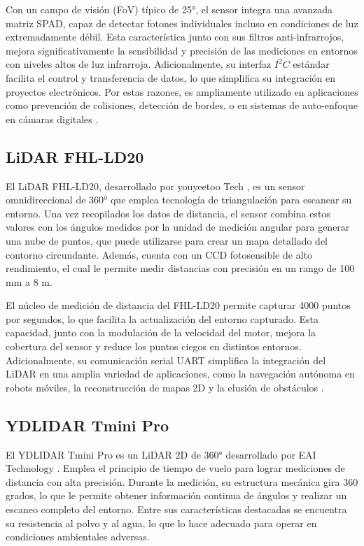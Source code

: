 Con un campo de visión (FoV) típico de 25°, el sensor integra una avanzada matriz SPAD, capaz de detectar fotones individuales incluso en condiciones de luz extremadamente débil. Esta característica junto con sus filtros anti-infrarrojos, mejora significativamente la sensibilidad y precisión de las mediciones en entornos con niveles altos de luz infrarroja. Adicionalmente, su interfaz $I^2C$ estándar facilita el control y transferencia de datos, lo que simplifica su integración en proyectos electrónicos. Por estas razones, es ampliamente utilizado en aplicaciones como prevención de colisiones, detección de bordes, o en sistemas de auto-enfoque en cámaras digitales \cite{stmicroelectronics_vl53l0x_2016}.

\subsection{LiDAR FHL-LD20}

El LiDAR FHL-LD20, desarrollado por youyeetoo Tech \cite{youyeetoo_tech_ld20_nodate}, es un sensor omnidireccional de 360° que emplea tecnología de triangulación para escanear su entorno. Una vez recopilados los datos de distancia, el sensor combina estos valores con los ángulos medidos por la unidad de medición angular para generar una nube de puntos, que puede utilizarse para crear un mapa detallado del contorno circundante. Además, cuenta con un CCD fotosensible de alto rendimiento, el cual le permite medir distancias con precisión en un rango de 100 mm a 8 m. 

El núcleo de medición de distancia del FHL-LD20 permite capturar 4000 puntos por segundos, lo que facilita la actualización del entorno capturado. Esta capacidad, junto con la modulación de la velocidad del motor, mejora la cobertura del sensor y reduce los puntos ciegos en distintos entornos. Adicionalmente, su comunicación serial UART simplifica la integración del LiDAR en una amplia variedad de aplicaciones, como la navegación autónoma en robots móviles, la reconstrucción de mapas 2D y la elusión de obstáculos \cite{youyeetoo_tech_ld20_nodate}.

\subsection{YDLIDAR Tmini Pro}

El YDLIDAR Tmini Pro es un LiDAR 2D de 360° desarrollado por EAI Technology \cite{eai_technology_ydlidar_2022}. Emplea el principio de tiempo de vuelo para lograr mediciones de distancia con alta precisión. Durante la medición, su estructura mecánica gira 360 grados, lo que le permite obtener información continua de ángulos y realizar un escaneo completo del entorno. Entre sus características destacadas se encuentra su resistencia al polvo y al agua, lo que lo hace adecuado para operar en condiciones ambientales adversas.

